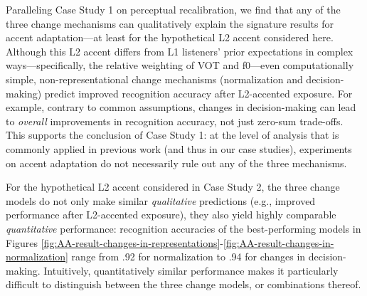 \documentclass[
  11pt,
  man,floatsintext]{apa6}
\begin{document}
Paralleling Case Study 1 on perceptual recalibration, we find that any of the three change mechanisms can qualitatively explain the signature results for accent adaptation---at least for the hypothetical L2 accent considered here. Although this L2 accent differs from L1 listeners' prior expectations in complex ways---specifically, the relative weighting of VOT and f0---even computationally simple, non-representational change mechanisms (normalization and decision-making) predict improved recognition accuracy after L2-accented exposure. For example, contrary to common assumptions, changes in decision-making can lead to \emph{overall} improvements in recognition accuracy, not just zero-sum trade-offs. This supports the conclusion of Case Study 1: at the level of analysis that is commonly applied in previous work (and thus in our case studies), experiments on accent adaptation do not necessarily rule out any of the three mechanisms.

For the hypothetical L2 accent considered in Case Study 2, the three change models do not only make similar \emph{qualitative} predictions (e.g., improved performance after L2-accented exposure), they also yield highly comparable \emph{quantitative} performance: recognition accuracies of the best-performing models in Figures \ref{fig:AA-result-changes-in-representations}-\ref{fig:AA-result-changes-in-normalization} range from .92 for normalization to .94 for changes in decision-making. Intuitively, quantitatively similar performance makes it particularly difficult to distinguish between the three change models, or combinations thereof.
\end{document}
